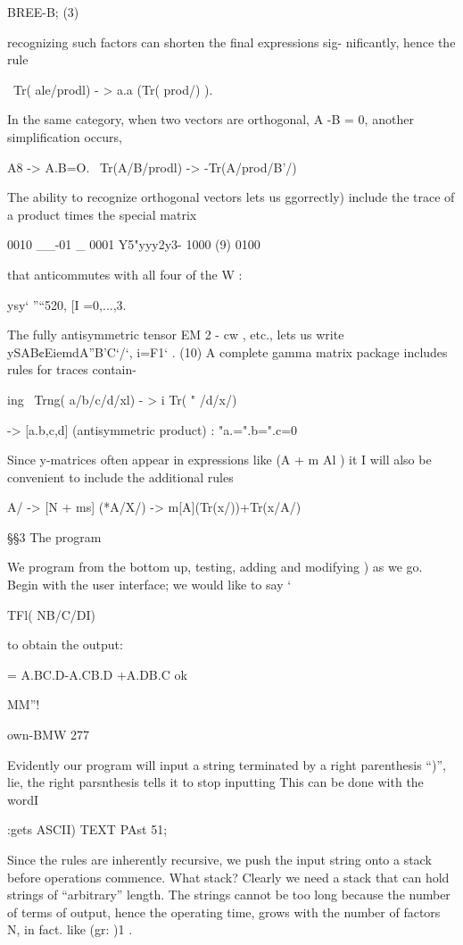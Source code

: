 BREE-B; (3)

recognizing such factors can shorten the ﬁnal expressions sig-
niﬁcantly, hence the rule

\ Tr( ale/prodl) - > a.a (Tr( prod/) ).

In the same category, when two vectors are orthogonal,
A -B = 0, another simpliﬁcation occurs,

\PERP A8 -> A.B=O.
\ Tr(A/B/prodl) -> -Tr(A/prod/B'/)

The ability to recognize orthogonal vectors lets us ggorrectly)
include the trace of a product times the special matrix

0010
__-01 _ 0001
Y5"yyy2y3- 1000 (9)
0100

that anticommutes with all four of the W :

ysy‘ ”“520, [I =0,...,3.

The fully antisymmetric tensor EM 2 - cw , etc., lets us write
ySAB¢EiemdA”B’C‘/‘, i=F1‘ . (10)
A complete gamma matrix package includes rules for traces contain-

ing
\ Trng( a/b/c/d/xl) - > i Tr( " /d/x/)

-> [a.b,c,d] (antisymmetric product)
\Note: "a.=".b=".c=0

 

Since y-matrices often appear in expressions like (A + m Al ) it I
will also be convenient to include the additional rules

\*A/ -> [N + ms]
\Tr(*A/X/) -> m[A](Tr(x/))+Tr(x/A/)

§§3 The program

We program from the bottom up, testing, adding and modifying )
as we go. Begin with the user interface; we would like to say ‘

TFl( NB/C/DI)

to obtain the output:

= A.BC.D-A.CB.D +A.DB.C ok

MM”!

own-BMW 277

Evidently our program will input a string terminated by a right
parenthesis “)”, lie, the right parsnthesis tells it to stop inputting
This can be done with the wordI

:gets ASCII) TEXT PAst 51;

Since the rules are inherently recursive, we push the input string onto a stack before operations commence. What stack? Clearly we need a stack that can hold strings of “arbitrary” length. The strings cannot be too long because the number of terms of output, hence the operating time, grows with the number of factors N, in fact. like (gr: )1 .

